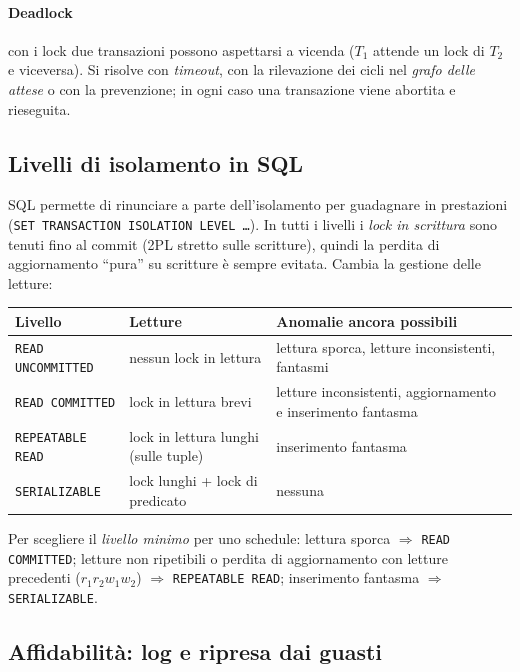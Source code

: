 \documentclass[a4paper,12pt]{article}
\begin{document}
\paragraph{Deadlock} con i lock due transazioni possono aspettarsi a vicenda
($T_1$ attende un lock di $T_2$ e viceversa). Si risolve con \emph{timeout},
con la rilevazione dei cicli nel \emph{grafo delle attese} o con la
prevenzione; in ogni caso una transazione viene abortita e rieseguita.

\subsection{Livelli di isolamento in SQL}

SQL permette di rinunciare a parte dell'isolamento per guadagnare in
prestazioni (\texttt{SET TRANSACTION ISOLATION LEVEL \ldots}). In tutti i
livelli i \emph{lock in scrittura} sono tenuti fino al commit (2PL stretto
sulle scritture), quindi la perdita di aggiornamento ``pura'' su scritture è
sempre evitata. Cambia la gestione delle letture:
\begin{center}
\begin{tabular}{llp{6.2cm}}
  \textbf{Livello} & \textbf{Letture} & \textbf{Anomalie ancora possibili} \\ \hline
  \texttt{READ UNCOMMITTED} & nessun lock in lettura & lettura sporca, letture inconsistenti, fantasmi \\
  \texttt{READ COMMITTED} & lock in lettura brevi & letture inconsistenti, aggiornamento e inserimento fantasma \\
  \texttt{REPEATABLE READ} & lock in lettura lunghi (sulle tuple) & inserimento fantasma \\
  \texttt{SERIALIZABLE} & lock lunghi + lock di predicato & nessuna \\
\end{tabular}
\end{center}
Per scegliere il \emph{livello minimo} per uno schedule: lettura sporca $\Rightarrow$
\texttt{READ COMMITTED}; letture non ripetibili o perdita di aggiornamento con
letture precedenti ($r_1 r_2 w_1 w_2$) $\Rightarrow$ \texttt{REPEATABLE READ};
inserimento fantasma $\Rightarrow$ \texttt{SERIALIZABLE}.

\subsection{Affidabilità: log e ripresa dai guasti}
\end{document}
